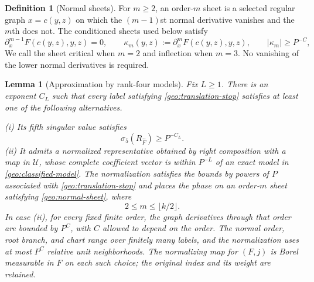 \documentclass[11pt]{amsart}
\newtheorem{lemma}[theorem]{Lemma}
\theoremstyle{definition}
\newtheorem{definition}{Definition}[section]
\theoremstyle{remark}
\numberwithin{equation}{section}
\begin{document}
\begin{definition}[Normal sheets]\label{def:normal-sheet}
For $m\ge2$, an order-$m$ sheet is a selected regular graph $x=c(y,z)$ on which the $(m-1)$st normal derivative vanishes and the $m$th does not. The conditioned sheets used below satisfy
\begin{equation}\label{geo:normal-sheet}
\partial_x^{m-1}F(c(y,z),y,z)=0,\qquad \kappa_m(y,z):=\partial_x^mF(c(y,z),y,z),\qquad |\kappa_m|\ge P^{-C},
\end{equation}
We call the sheet critical when $m=2$ and inflection when $m=3$. No vanishing of the lower normal derivatives is required.
\end{definition}
\begin{lemma}[Approximation by rank-four models]\label{geo:rank-entry}
Fix $L\ge1$. There is an exponent $C_L$ such that every label satisfying \eqref{geo:translation-stop} satisfies at least one of the following alternatives.

\textup{(i)} Its fifth singular value satisfies
\[
\sigma_5(R_{\widehat F})\ge P^{-C_L}.
\]
\textup{(ii)} It admits a normalized representative obtained by right composition with a map in $\mathcal U$, whose complete coefficient vector is within $P^{-L}$ of an exact model in \eqref{geo:classified-model}. The normalization satisfies the bounds by powers of $P$ associated with \eqref{geo:translation-stop} and places the phase on an order-$m$ sheet satisfying \eqref{geo:normal-sheet}, where
\[
2\le m\le\lfloor k/2\rfloor.
\]
In case \textup{(ii)}, for every fixed finite order, the graph derivatives through that order are bounded by $P^C$, with $C$ allowed to depend on the order. The normal order, root branch, and chart range over finitely many labels, and the normalization uses at most $P^C$ relative unit neighborhoods. The normalizing map for $(F,j)$ is Borel measurable in $F$ on each such choice; the original index and its weight are retained.
\end{lemma}
\end{document}
